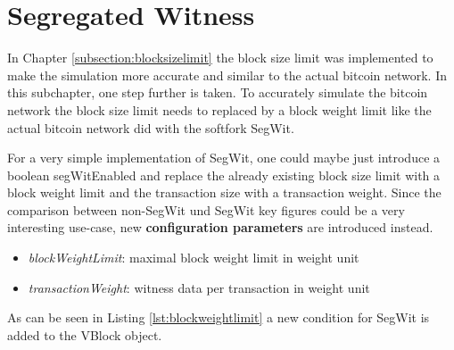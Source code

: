 \section{Segregated Witness \label{subsection:segwit}}
In Chapter \ref{subsection:blocksizelimit} the block size limit was implemented to make the simulation more accurate and similar to the actual bitcoin network. In this subchapter, one step further is taken. To accurately simulate the bitcoin network the block size limit needs to replaced by a block weight limit like the actual bitcoin network did with the softfork SegWit.

For a very simple implementation of SegWit, one could maybe just introduce a boolean segWitEnabled and replace the already existing block size limit with a block weight limit and the transaction size with a transaction weight. Since the comparison between non-SegWit und SegWit key figures could be a very interesting use-case, new \textbf{configuration parameters} are introduced instead.

\begin{itemize}
\item \textit{blockWeightLimit}: maximal block weight limit in weight unit
\item \textit{transactionWeight}: witness data per transaction in weight unit
\end{itemize}

As can be seen in Listing \ref{lst:blockweightlimit} a new condition for SegWit is added to the VBlock object.

